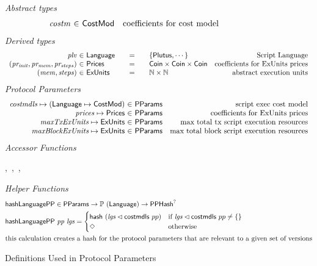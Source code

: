 \begin{figure*}[htb]
  \emph{Abstract types}
  \begin{equation*}
    \begin{array}{r@{~\in~}lr}
      \var{costm} & \CostMod & \text{coefficients for cost model} \\
    \end{array}
  \end{equation*}
  \emph{Derived types}
  \begin{equation*}
    \begin{array}{r@{~\in~}l@{\qquad=\qquad}lr}
      \var{plv}
      & \Language
      & \{\Plutus, \dotsb\}
      & \text{Script Language}
      \\
      \var{(pr_{init}, pr_{mem}, pr_{steps})}
      & \Prices
      & \Coin \times \Coin \times \Coin
      & \text {coefficients for ExUnits prices}
      \\
      \var{(mem, steps)}
      & \ExUnits
      & \N \times \N
      & \text{abstract execution units} \\
    \end{array}
  \end{equation*}
  \emph{Protocol Parameters}
  \begin{equation*}
      \begin{array}{r@{~\in~}lr}
        \var{costmdls} \mapsto (\Language \mapsto \CostMod) & \PParams & \text{script exec cost model}\\
        \var{prices} \mapsto \Prices & \PParams & \text{coefficients for ExUnits prices} \\
        \var{maxTxExUnits} \mapsto \ExUnits & \PParams & \text{max total tx script execution resources}\\
        \var{maxBlockExUnits} \mapsto \ExUnits & \PParams & \text{max total block script execution resources}\\
      \end{array}
  \end{equation*}
  \emph{Accessor Functions}
  \begin{center}
  ,~,~,~
  \end{center}
  \emph{Helper Functions}
  \begin{align*}
    & \mathsf{hashLanguagePP} \in \mathsf{PParams} \to \mathbb{P}~(\mathsf{Language}) \to \mathsf{PPHash}^?   \\
    & \mathsf{hashLanguagePP}~\mathit{pp}~\mathit{lgs} = \begin{cases}
         \mathsf{hash}~(\mathit{lgs} \lhd \mathsf{costmdls}~{pp})
                           & \text{if~} \mathit{lgs} \lhd \mathsf{costmdls}~{pp} \neq \{\} \\
              \Diamond & \text{otherwise} \\
      \end{cases} \\
    & \text{this calculation creates a hash for the protocol parameters that are relevant to
    a given set of versions}
  \end{align*}
  \caption{Definitions Used in Protocol Parameters}
  \label{fig:defs:protocol-parameters}
\end{figure*}


\clearpage
